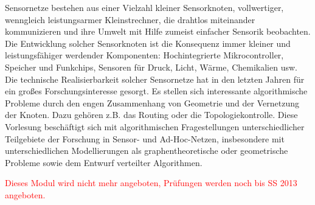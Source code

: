 \begin{module}
\begin{learningoutcomes}
\end{learningoutcomes}

\begin{content}
Sensornetze bestehen aus einer Vielzahl kleiner Sensorknoten, vollwertiger, wenngleich leistungsarmer Kleinstrechner, \newline
die drahtlos miteinander kommunizieren und ihre Umwelt mit Hilfe zumeist einfacher Sensorik beobachten. Die Entwicklung solcher Sensorknoten ist die Konsequenz immer kleiner und leistungsfähiger werdender Komponenten: Hochintegrierte Mikrocontroller, Speicher und Funkchips, Sensoren für Druck, Licht, Wärme, Chemikalien usw.\newline
Die technische Realisierbarkeit solcher Sensornetze hat in den letzten Jahren für ein großes Forschungsinteresse gesorgt. Es stellen sich interessante algorithmische Probleme durch den engen Zusammenhang von Geometrie und der Vernetzung der Knoten. Dazu gehören z.B. das Routing oder die Topologiekontrolle.\newline
Diese Vorlesung beschäftigt sich mit algorithmischen Fragestellungen unterschiedlicher Teilgebiete der Forschung in Sensor- und Ad-Hoc-Netzen, insbesondere mit unterschiedlichen Modellierungen als graphentheoretische oder geometrische Probleme sowie dem Entwurf verteilter Algorithmen.


\end{content}

\begin{remarks}\textcolor{red}{Dieses Modul wird nicht mehr angeboten, Prüfungen werden noch bis SS 2013 angeboten.}

\end{remarks}

\end{module}

